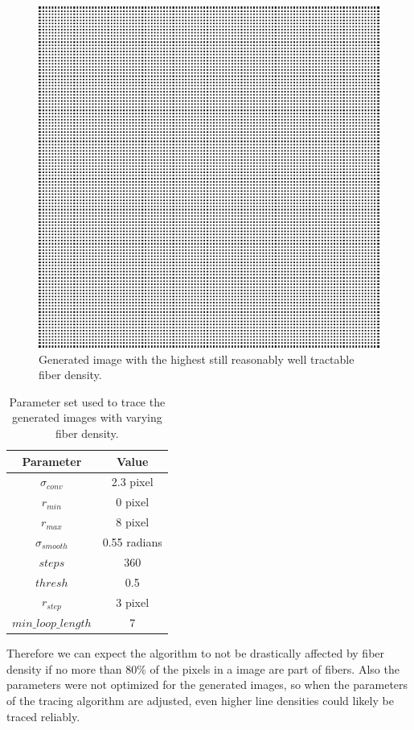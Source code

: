 \documentclass[12pt,english,twocolumn]{revtex4}
\begin{document}
\begin{figure}[h]
	\includegraphics[width=\linewidth]{illustrations/last_working.png}
	\caption{Generated image with the highest still reasonably well tractable fiber density.}
	\label{fig:last_working}
\end{figure}
\begin{table}[h!]
\centering
\caption{Parameter set used to trace the generated images with varying fiber density.}
\label{tab:parameters_dense}
\begin{tabular}{c|c}
	Parameter & Value\\
	\hline
	$\sigma_{conv}$ & 2.3 pixel\\
	$r_{min}$ & 0 pixel\\
	$r_{max}$ & 8 pixel\\
	$\sigma_{smooth}$ & 0.55 radians\\
	$steps$ & 360\\
	$thresh$ & 0.5\\
	$r_{step}$ & 3 pixel\\
	$min\_loop\_length$ & 7\\
\end{tabular}
\end{table}
Therefore we can expect the algorithm to not be drastically affected by fiber density if no more than 80\% of the pixels in a image are part of fibers. Also the parameters were not optimized for the generated images, so when the parameters of the tracing algorithm are adjusted, even higher line densities could likely be traced reliably.
\end{document}
